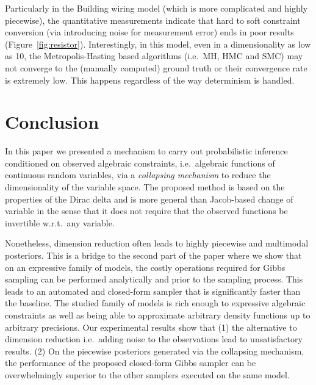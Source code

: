 \documentclass[letterpaper]{article}
\begin{document}
Particularly in the Building wiring model (which is more complicated and highly piecewise), the quantitative measurements 
indicate that hard to soft constraint conversion (via introducing noise for measurement error) ends in poor results (Figure~\ref{fig:resistor}).
Interestingly, in this model, even in a dimensionality as low as 10, 
the Metropolis-Hasting based algorithms (i.e.\ MH, HMC and SMC) may not converge to the (manually computed) ground truth or their convergence rate is extremely low. 
This happens regardless of the way determinism is handled. 

\section{Conclusion}
\label{sect:conclusion}

In this paper we presented a mechanism to carry out probabilistic inference conditioned on observed algebraic constraints, i.e.\ algebraic functions of continuous random variables, via a \emph{collapsing mechanism} to reduce the dimensionality of the variable space.
The proposed method is based on the properties of the Dirac delta and is more general than Jacob-based change of variable in the sense that it does not require that the observed functions be invertible w.r.t.\ any variable.  

Nonetheless, dimension reduction often leads to highly piecewise and multimodal posteriors.
This is a bridge to the second part of the paper where we show that on an expressive family of models, the costly operations required for Gibbs sampling can be performed analytically and prior to the sampling process.
This leads to an automated and closed-form sampler that is significantly faster than the baseline.
The studied family of models is rich enough to expressive algebraic constraints as well as being able to approximate arbitrary density functions up to arbitrary precisions.
Our experimental results show that (1) the alternative to dimension reduction i.e.\ adding noise to the observations lead to unsatisfactory results. 
(2) %
On the piecewise posteriors generated via the collapsing mechanism, the performance of the proposed closed-form Gibbs sampler can be overwhelmingly superior to the other samplers executed on the same model.   
\end{document}
